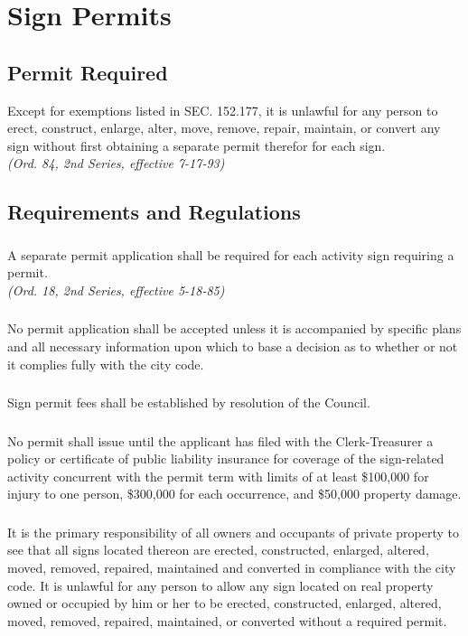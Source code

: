 \section{Sign Permits}
\subsection{Permit Required}
Except for exemptions listed in SEC. 152.177, it is unlawful for any person to erect, construct, enlarge, alter, move, remove, repair, maintain, or convert any sign without first obtaining a separate permit therefor for each sign.\\
\emph{(Ord. 84, 2nd Series, effective 7-17-93)}
\subsection{Requirements and Regulations}
\subsubsection{}
A separate permit application shall be required for each activity sign requiring a permit.\\
\emph{(Ord. 18, 2nd Series, effective 5-18-85)}
\subsubsection{}
No permit application shall be accepted unless it is accompanied by specific plans and all necessary information upon which to base a decision as to whether or not it complies fully with the city code.
\subsubsection{}
Sign permit fees shall be established by resolution of the Council.
\subsubsection{}
No permit shall issue until the applicant has filed with the Clerk-Treasurer a policy or certificate of public liability insurance for coverage of the sign-related activity concurrent with the permit term with limits of at least \$100,000 for injury to one person, \$300,000 for each occurrence, and \$50,000 property damage.
\subsubsection{}
It is the primary responsibility of all owners and occupants of private property to see that all signs located thereon are erected, constructed, enlarged, altered, moved, removed, repaired, maintained and converted in compliance with the city code.  It is unlawful for any person to allow any sign located on real property owned or occupied by him or her to be erected, constructed, enlarged, altered, moved, removed, repaired, maintained, or converted without a required permit.

